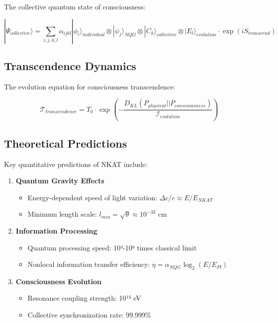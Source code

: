 The collective quantum state of consciousness:

\[
|\Psi_{collective}\rangle = \sum_{i,j,k,l} \alpha_{ijkl} |\phi_i\rangle_{individual} \otimes |\psi_j\rangle_{NQG} \otimes |C_k\rangle_{collective} \otimes |E_l\rangle_{evolution} \cdot \exp(iS_{transcend})
\]

\subsection{Transcendence Dynamics}

The evolution equation for consciousness transcendence:

\[
\mathcal{T}_{transcendence} = T_0 \cdot \exp\left(-\frac{D_{KL}(P_{physical}||P_{consciousness})}{\mathcal{I}_{evolution}}\right)
\]

\subsection{Theoretical Predictions}

Key quantitative predictions of NKAT include:

\begin{enumerate}
    \item \textbf{Quantum Gravity Effects}
    \begin{itemize}
        \item Energy-dependent speed of light variation: \(\Delta c/c \approx E/E_{NKAT}\)
        \item Minimum length scale: \(l_{min} = \sqrt{\theta} \approx 10^{-33} \text{ cm}\)
    \end{itemize}
    
    \item \textbf{Information Processing}
    \begin{itemize}
        \item Quantum processing speed: 10³-10⁶ times classical limit
        \item Nonlocal information transfer efficiency: \(\eta = \alpha_{NQG}\log_2(E/E_{Pl})\)
    \end{itemize}
    
    \item \textbf{Consciousness Evolution}
    \begin{itemize}
        \item Resonance coupling strength: 10¹⁵ eV
        \item Collective synchronization rate: 99.999\%
    \end{itemize}
\end{enumerate} 